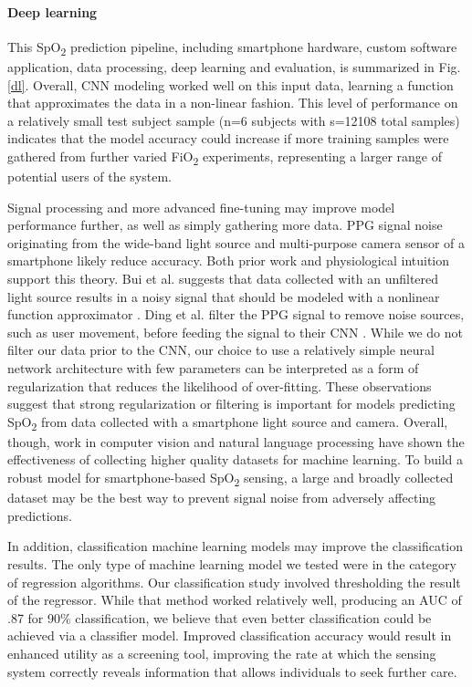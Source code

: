 \documentclass[12pt]{article}
\begin{document}
\paragraph*{Deep learning}
This SpO\textsubscript{2} prediction pipeline, including smartphone hardware, custom software application, data processing, deep learning and evaluation, is summarized in Fig. \ref{dl}.  Overall, CNN modeling worked well on this input data, learning a function that approximates the data in a non-linear fashion.
This level of performance on a relatively small test subject sample (n=6 subjects with s=12108 total samples) indicates that the model accuracy could increase if more training samples were gathered from further varied FiO\textsubscript{2} experiments, representing a larger range of potential users of the system.

Signal processing and more advanced fine-tuning may improve model performance further, as well as simply gathering more data.
PPG signal noise originating from the wide-band light source and multi-purpose camera sensor of a smartphone likely reduce accuracy. Both prior work and physiological intuition support this theory. Bui et al. suggests that data collected with an unfiltered light source results in a noisy signal that should be modeled with a nonlinear function approximator \cite{bui2020smartphone}. Ding et al. filter the PPG signal to remove noise sources, such as user movement, before feeding the signal to their CNN \cite{ding2018measuring}. While we do not filter our data prior to the CNN, our choice to use a relatively simple neural network architecture with few parameters can be interpreted as a form of regularization that reduces the likelihood of over-fitting. These observations suggest that strong regularization or filtering is important for models predicting SpO\textsubscript{2} from data collected with a smartphone light source and camera.
Overall, though, work in computer vision\cite{Deng2009ImageNetAL} and natural language processing \cite{Brown2020LanguageMA} have shown the effectiveness of collecting higher quality datasets for machine learning. To build a robust model for smartphone-based SpO\textsubscript{2} sensing, a large and broadly collected dataset may be the best way to prevent signal noise from adversely affecting predictions.

In addition, classification machine learning models may improve the classification results.  The only type of machine learning model we tested were in the category of regression algorithms.  Our classification study involved thresholding the result of the regressor.  While that method worked relatively well, producing an AUC of .87 for 90\% classification, we believe that even better classification could be achieved via a classifier model.  Improved classification accuracy would result in enhanced utility as a screening tool, improving the rate at which the sensing system correctly reveals information that allows individuals to seek further care.
\end{document}
